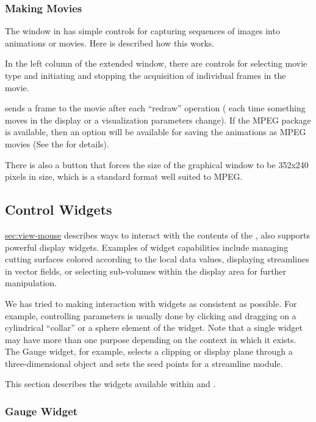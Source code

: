 \subsubsection{Making Movies}
\label{sec:view-movies} 

The \viewer{} window in \SR{} has simple controls for capturing sequences
of images into animations or movies.  Here is described how this works.

In the left column of the extended \viewer{} window, there are controls for
selecting movie type and initiating and stopping the acquisition of
individual frames in the movie.

\SR{} sends a frame to the movie after each ``redraw'' operation ( \ie{}
each time something moves in the display or a visualization parameters
change).  If the MPEG package is available, then an option will be available for saving the animations as MPEG movies (See the
 for details).

There is also a button that forces the size of the graphical window to be
352x240 pixels in size, which is a standard format well suited to MPEG.

\subsection{Control Widgets}
\label{sec:view-widgets} 

\hyperref{Mouse controls}{mouse controls in
Section}{}{sec:view-mouse} describes ways to interact with the contents
of the \viewer{}, \SR{} also supports  powerful display widgets.
Examples of widget capabilities include managing cutting surfaces colored
according to the local data values, displaying streamlines in vector
fields, or selecting sub-volumes within the display area for further
manipulation. 
 
We has tried to making interaction with widgets as consistent as
possible. For example, controlling parameters is usually done by
clicking and dragging on a cylindrical ``collar'' or a sphere element
of the widget. Note that a single widget may have more than one
purpose depending on the context in which it exists. The Gauge widget,
for example, selects a clipping or display plane through a
three-dimensional object and sets the seed points for a streamline
module.

This section describes the widgets available within \SR{} and \BIOPSE{}.
 

\subsubsection{Gauge Widget}
\label{sec:view-gaugewidget} 

